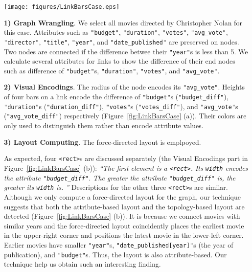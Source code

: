 \begin{figure*}[ht]
    \centering
    \texttt{[image: figures/LinkBarsCase.eps]}
    \caption{xxx}
    \label{fig:LinkBarsCase}
\end{figure*}

\textbf{1) Graph Wrangling}.
We select all movies directed by Christopher Nolan for this case.
Attributes such as \texttt{"budget"}, \texttt{"duration"}, \texttt{"votes"}, \texttt{"avg\_vote"}, \texttt{"director"}, \texttt{"title"}, \texttt{"year"}, and \texttt{"date\_published"} are preserved on nodes.
Two nodes are connected if the difference betwee their \texttt{"year"}s is less than 5.
We calculate several attributes for links to show the difference of their end nodes such as difference of \texttt{"budget"}s, \texttt{"duration"}, \texttt{"votes"}, and \texttt{"avg\_vote"}.

\textbf{2) Visual Encodings}.
The radius of the node encodes its \texttt{"avg\_vote"}.
Heights of four bars on a link encode the difference of \texttt{"budget"}s (\texttt{"budget\_diff"}), \texttt{"duration"}s (\texttt{"duration\_diff"}), \texttt{"votes"}s (\texttt{"votes\_diff"}), and \texttt{"avg\_vote"}s (\texttt{"avg\_vote\_diff"}) respectively (Figure~\ref{fig:LinkBarsCase} (a)).
Their colors are only used to distinguish them rather than encode attribute values.

\textbf{3) Layout Computing}.
The force-directed layout is emplpoyed.

As expected, four \texttt{<rect>}s are discussed separately (the Visual Encodings part in Figure~\ref{fig:LinkBarsCase} (b)):
\textit{``The first element is a \texttt{<rect>}. Its \texttt{width} encodes the attribute \texttt{"budget\_diff"}. The greater the attribute \texttt{"budget\_diff"} is, the greater its \texttt{width} is.
''}
Descriptions for the other three \texttt{<rect>}s are similar.
Although we only compute a force-directed layout for the graph, our technique suggests that both the attribute-based layout and the topology-based layout are detected (Figure~\ref{fig:LinkBarsCase} (b)).
It is because we connect movies with similar years and the force-directed layout coincidently places the earliest movie in the upper-right corner and positions the latest movie in the lower-left corner.
Earlier movies have smaller \texttt{"year"}s, \texttt{"date\_published[year]"}s (the year of publication), and \texttt{"budget"}s.
Thus, the layout is also attribute-based.
Our technique help us obtain such an interesting finding.